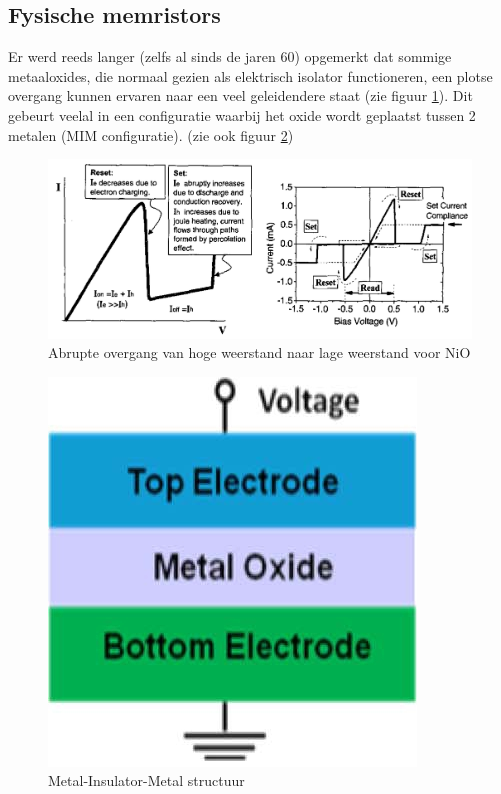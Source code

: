 \subsection{Fysische memristors}
Er werd reeds langer (zelfs al sinds de jaren 60) opgemerkt dat sommige metaaloxides, die normaal gezien als elektrisch isolator functioneren, een plotse overgang kunnen ervaren naar een veel geleidendere staat (zie figuur \ref{fig:i-v}). Dit gebeurt veelal in een configuratie waarbij het oxide wordt geplaatst tussen 2 metalen (MIM configuratie).\cite{Won12} (zie ook figuur \ref{fig:mim}) 

\begin{figure}
  \centering
  \includegraphics[scale=0.25]{../fig/hfdstk-cel-I-V.png}
  \caption{Abrupte overgang van hoge weerstand naar lage weerstand voor NiO\cite{Bae04}}
  \label{fig:i-v}
\end{figure}

\begin{figure}
  \centering
  \includegraphics[scale=0.4]{../fig/hfdstk-cel-MIM.png}
  \caption{Metal-Insulator-Metal structuur\cite{Won12}}
  \label{fig:mim}
\end{figure}

